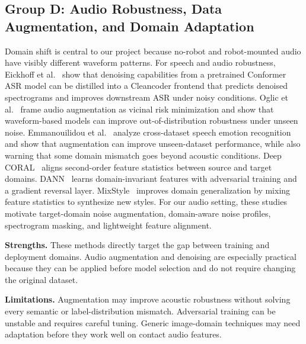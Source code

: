 \documentclass[12pt,a4paper]{article}
\begin{document}
\subsection{Group D: Audio Robustness, Data Augmentation, and Domain Adaptation}

Domain shift is central to our project because no-robot and robot-mounted audio have visibly different waveform patterns. For speech and audio robustness, Eickhoff et al.~\cite{eickhoff2023bring} show that denoising capabilities from a pretrained Conformer ASR model can be distilled into a Cleancoder frontend that predicts denoised spectrograms and improves downstream ASR under noisy conditions. Oglic et al.~\cite{oglic2022waveform} frame audio augmentation as vicinal risk minimization and show that waveform-based models can improve out-of-distribution robustness under unseen noise. Emmanouilidou et al.~\cite{emmanouilidou2024domain} analyze cross-dataset speech emotion recognition and show that augmentation can improve unseen-dataset performance, while also warning that some domain mismatch goes beyond acoustic conditions. Deep CORAL~\cite{sun2016deepcoral} aligns second-order feature statistics between source and target domains. DANN~\cite{ganin2016dann} learns domain-invariant features with adversarial training and a gradient reversal layer. MixStyle~\cite{zhou2021mixstyle} improves domain generalization by mixing feature statistics to synthesize new styles. For our audio setting, these studies motivate target-domain noise augmentation, domain-aware noise profiles, spectrogram masking, and lightweight feature alignment.

\textbf{Strengths.} These methods directly target the gap between training and deployment domains. Audio augmentation and denoising are especially practical because they can be applied before model selection and do not require changing the original dataset.

\textbf{Limitations.} Augmentation may improve acoustic robustness without solving every semantic or label-distribution mismatch. Adversarial training can be unstable and requires careful tuning. Generic image-domain techniques may need adaptation before they work well on contact audio features.
\end{document}
